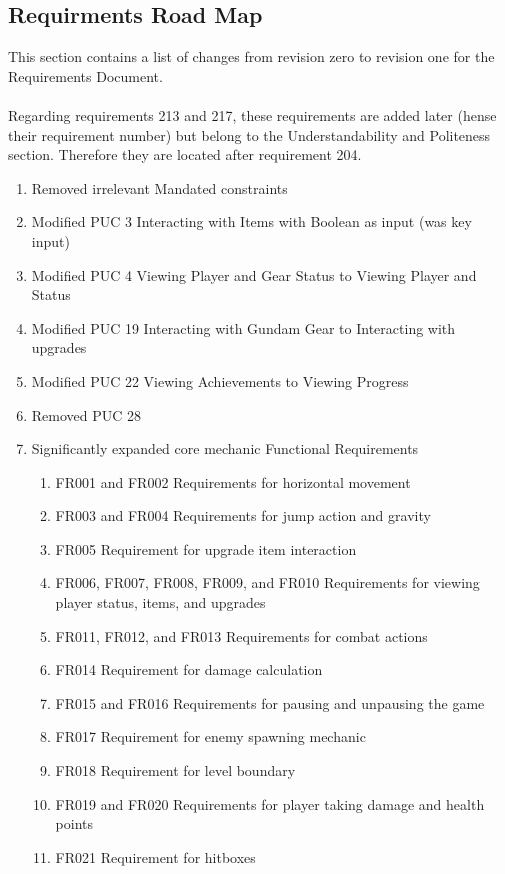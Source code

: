 \documentclass[]{article}
\begin{document}
\subsection*{Requirments Road Map}
This section contains a list of changes from revision zero to revision one for the Requirements Document.\\\\
Regarding requirements 213 and 217, these requirements are added later (hense their requirement number) but belong to the Understandability and Politeness section. Therefore they are located after requirement 204. 
  \begin{enumerate}
        \item Removed irrelevant Mandated constraints
        \item Modified PUC 3 Interacting with Items with Boolean as input (was key input)
        \item Modified PUC 4 Viewing Player and Gear Status to Viewing Player and Status
        \item Modified PUC 19 Interacting with Gundam Gear to Interacting with upgrades
        \item Modified PUC 22 Viewing Achievements to Viewing Progress
        \item Removed PUC 28
        \item Significantly expanded core mechanic Functional Requirements
	 \begin{enumerate}
		\item FR001 and FR002 Requirements for horizontal movement
		\item FR003 and FR004 Requirements for jump action and gravity
		\item FR005 Requirement for upgrade item interaction
		\item FR006, FR007, FR008, FR009, and FR010  Requirements for viewing player status, items, and upgrades
		\item FR011, FR012, and FR013 Requirements for combat actions
		\item FR014 Requirement for damage calculation
		\item FR015 and FR016 Requirements for pausing and unpausing the game
		\item FR017 Requirement for enemy spawning mechanic
		\item FR018 Requirement for level boundary
		\item FR019 and FR020 Requirements for player taking damage and health points
		\item FR021 Requirement for hitboxes

\end{enumerate}
\end{enumerate}
\end{document}
